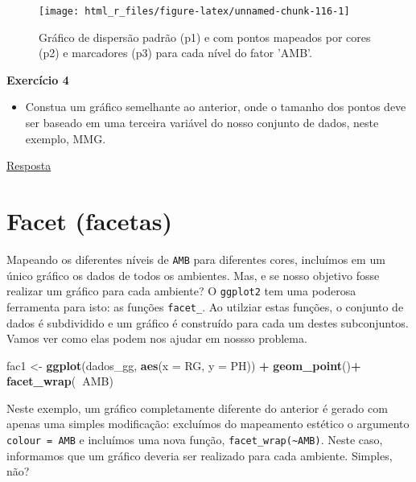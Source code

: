 \documentclass[
]{book}
\newenvironment{Shaded}{\begin{snugshade}}{\end{snugshade}}
\newcommand{\DataTypeTok}[1]{\textcolor[rgb]{0.13,0.29,0.53}{#1}}
\newcommand{\KeywordTok}[1]{\textcolor[rgb]{0.13,0.29,0.53}{\textbf{#1}}}
\newcommand{\NormalTok}[1]{#1}
\newcommand{\OperatorTok}[1]{\textcolor[rgb]{0.81,0.36,0.00}{\textbf{#1}}}
\newcommand{\StringTok}[1]{\textcolor[rgb]{0.31,0.60,0.02}{#1}}
\providecommand{\tightlist}{%
  \setlength{\itemsep}{0pt}\setlength{\parskip}{0pt}}
\begin{document}
\begin{figure}

{\centering \texttt{[image: html\_r\_files/figure-latex/unnamed-chunk-116-1]} 

}

\caption{Gráfico de dispersão padrão (p1) e com pontos mapeados por cores (p2) e marcadores (p3) para cada nível do fator 'AMB'.}\label{fig:unnamed-chunk-116}
\end{figure}

\begin{tarefa}
\textbf{Exercício 4}

\begin{itemize}
\tightlist
\item
  Constua um gráfico semelhante ao anterior, onde o tamanho dos pontos deve ser baseado em uma terceira variável do nosso conjunto de dados, neste exemplo, MMG.
\end{itemize}
\end{tarefa}

\protect\hyperlink{exerc4}{Resposta}

\hypertarget{facet-facetas}{%
\section{Facet (facetas)}\label{facet-facetas}}

Mapeando os diferentes níveis de \texttt{AMB} para diferentes cores, incluímos em um único gráfico os dados de todos os ambientes. Mas, e se nosso objetivo fosse realizar um gráfico para cada ambiente? O \texttt{ggplot2} tem uma poderosa ferramenta para isto: as funções \texttt{facet\_}. Ao utilziar estas funções, o conjunto de dados é subdividido e um gráfico é construído para cada um destes subconjuntos. Vamos ver como elas podem nos ajudar em nossso problema. 

\begin{Shaded}
\begin{Highlighting}[]
\NormalTok{fac1 <-}\StringTok{ }\KeywordTok{ggplot}\NormalTok{(dados_gg, }\KeywordTok{aes}\NormalTok{(}\DataTypeTok{x =}\NormalTok{ RG, }\DataTypeTok{y =}\NormalTok{ PH)) }\OperatorTok{+}
\StringTok{        }\KeywordTok{geom_point}\NormalTok{()}\OperatorTok{+}
\StringTok{        }\KeywordTok{facet_wrap}\NormalTok{(}\OperatorTok{~}\NormalTok{AMB)}
\end{Highlighting}
\end{Shaded}

Neste exemplo, um gráfico completamente diferente do anterior é gerado com apenas uma simples modificação: excluímos do mapeamento estético o argumento \texttt{colour\ =\ AMB} e incluímos uma nova função, \texttt{facet\_wrap(\textasciitilde{}AMB)}. Neste caso, informamos que um gráfico deveria ser realizado para cada ambiente. Simples, não? 
\end{document}
